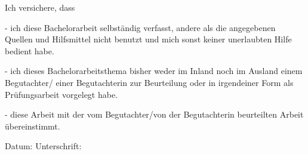 \label{erklaerung}

\begin{flushleft}
Ich versichere, dass 
\end{flushleft}

\begin{flushleft}
- ich diese Bachelorarbeit selbständig verfasst, andere als die angegebenen Quellen und Hilfsmittel nicht benutzt und mich sonst keiner unerlaubten Hilfe bedient habe.
\end{flushleft}

\begin{flushleft}
- ich dieses Bachelorarbeitsthema bisher weder im Inland noch im Ausland einem Begutachter/ einer Begutachterin zur Beurteilung oder in irgendeiner Form als Prüfungsarbeit vorgelegt habe.	
\end{flushleft}

\begin{flushleft}
- diese Arbeit mit der vom Begutachter/von der Begutachterin beurteilten Arbeit übereinstimmt. \\[1.5cm]	
\end{flushleft}
Datum:	\hrulefill\enspace Unterschrift: \hrulefill
\\[3.5cm]